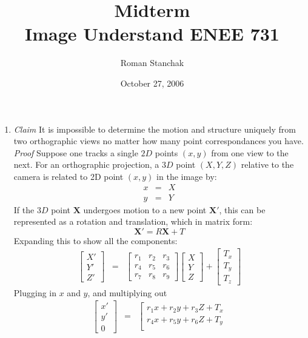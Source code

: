 \documentclass{article}
\title{ Midterm \\ Image Understand ENEE 731 }
\author{ Roman Stanchak }
\date{ October 27, 2006 }
\begin{document}
\maketitle
\begin{enumerate}
\item \textit{Claim} It is impossible to determine the motion and structure uniquely from two orthographic views no matter how many point correspondances you have. 
\\
\textit{Proof} Suppose one tracks a single $2D$ points $(x,y)$ from one view to the next.  For an orthographic
projection, a $3D$ point $(X,Y,Z)$ relative to the camera is related to 2D point $(x,y)$ in the image by:
\begin{eqnarray}
x&=&X\\
y&=&Y
\end{eqnarray}
If the $3D$ point $\mathbf{X}$ undergoes motion to a new point $\mathbf{X}'$, this can be represented as a rotation and translation, which in matrix form:
$$\mathbf{X}'=R\mathbf{X}+T$$
Expanding this to show all the components:
\begin{eqnarray}
\left[
\begin{array}{c}
	X'\\
	Y'\\
	Z'
\end{array}
\right] &=& 
\left[
\begin{array}{ccc}
	r_1 & r_2 & r_3 \\
	r_4 & r_5 & r_6 \\
	r_7 & r_8 & r_9
\end{array}
\right]
\left[
\begin{array}{c}
	X\\
	Y\\
	Z
\end{array}
\right] + 
\left[
\begin{array}{c}
	T_x\\
	T_y\\
	T_z
\end{array}
\right]
\end{eqnarray}
Plugging in $x$ and $y$, and multiplying out
\begin{eqnarray}
	\left[
	\begin{array}{c}
		x'\\
		y'\\
		0
	\end{array}
	\right]
	&=&
\left[
\begin{array}{c}
	r_1x + r_2y + r_3Z + T_x\\
	r_4x + r_5y + r_6Z + T_y\\

\end{array}
\end{eqnarray}
\end{enumerate}
\end{document}
